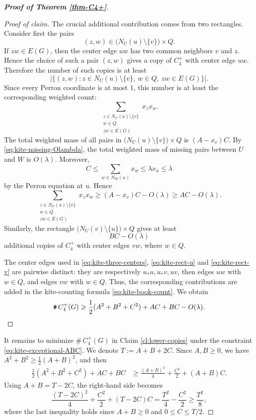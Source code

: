\documentclass[11pt,a4paper]{article}
\theoremstyle{definition}
\theoremstyle{plain}
\renewcommand{\le}{\leqslant}
\renewcommand{\ge}{\geqslant}
\begin{document}
\begin{proof}[{\bf Proof of Theorem \ref{thm-C4+}}]
\begin{proof}[Proof of claim]
The crucial additional contribution comes from two rectangles.  Consider first
the pairs
\[
        (z,w)\in \bigl(N_U(u)\setminus\{v\}\bigr)\times Q.
\]
If \(zw\in E(G)\), then the center edge \(uw\) has two common neighbors
\(v\) and \(z\).  Hence the choice of such a pair \((z,w)\) gives a copy of
\(C_4^+\) with center edge \(uw\).  Therefore the number of such copies is at
least
\[
        \left|\{(z,w): z\in N_U(u)\setminus\{v\},\ w\in Q,\ zw\in E(G)\}\right|.
\]
Since every Perron coordinate is at most \(1\), this number is at least the
corresponding weighted count:
\[
        \sum_{\substack{z\in N_U(u)\setminus\{v\}\\ w\in Q\\ zw\in E(G)}}x_zx_w.
\]
The total weighted mass of all pairs in
\(\bigl(N_U(u)\setminus\{v\}\bigr)\times Q\) is \((A-x_v)C\).  By
\eqref{eq:kite-missing-Olambda}, the total weighted mass of missing pairs
between \(U\) and \(W\) is \(O(\lambda)\).  Moreover,
\[
        C\le \sum_{w\in N_W(u)}x_w\le \lambda x_u\le \lambda
\]
by the Perron equation at \(u\).  Hence
\begin{equation}\label{eq:kite-rect-u} 
        \sum_{\substack{z\in N_U(u)\setminus\{v\}\\ w\in Q\\ zw\in E(G)}}x_zx_w
        \ge
        (A-x_v)C-O(\lambda) \ge
        AC-O(\lambda). 
\end{equation}
Similarly, the rectangle
$   \bigl(N_U(v)\setminus\{u\}\bigr)\times Q$ 
gives at least
\begin{equation}\label{eq:kite-rect-v}
        BC-O(\lambda)
\end{equation}
additional copies of \(C_4^+\) with center edges \(vw\), where \(w\in Q\).

The center edges used in \eqref{eq:kite-three-centers},
\eqref{eq:kite-rect-u} and \eqref{eq:kite-rect-v} are pairwise distinct:
they are respectively \(u_*u,u_*v,uv\), then edges \(uw\) with \(w\in Q\), and
edges \(vw\) with \(w\in Q\).  Thus, the corresponding contributions are 
added in the kite-counting formula \eqref{eq:kite-book-count}.  We obtain
\begin{equation*}  
        \texttt{\#}\, C_4^+(G) 
        \ge
        \frac12(A^2+B^2+C^2)+AC+BC-O(\lambda). 
        \qedhere 
\end{equation*}
\end{proof}

It remains to minimize $\texttt{\#}\, C_4^+(G)$ in Claim \ref{cl:lower-copies} under the constraint 
\eqref{eq:kite-exceptional-ABC}. We denote 
$   T:=A+B+2C $.   
Since $A,B\ge 0$, we have \(A^2+B^2\ge \frac{1}{2}(A+B)^2\), and then 
\[
\begin{aligned}
        \frac12(A^2+B^2+C^2)+AC+BC
        &\ge
        \frac{(A+B)^2}{4}+\frac{C^2}{2}+(A+B)C.
\end{aligned}
\]
Using \(A+B=T-2C\), the right-hand side becomes
\[
        \frac{(T-2C)^2}{4}+\frac{C^2}{2}+(T-2C)C
        =
        \frac{T^2}{4}-\frac{C^2}{2} \ge \frac{T^2}{8},
\]
where the last inequality holds since \(A+B\ge0\) and \(0\le C\le T/2\).  


\end{proof}
\end{document}
